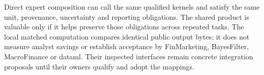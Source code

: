 Direct expert composition can call the same qualified kernels and satisfy the
same unit, provenance, uncertainty and reporting obligations. The shared product
is valuable only if it helps preserve those obligations across repeated tasks.
The local matched computation compares identical public output bytes; it does
not measure analyst savings or establish acceptance by FinMarketing,
BayesFilter, MacroFinance or dataml. Their inspected interfaces remain concrete
integration proposals until their owners qualify and adopt the mappings.
